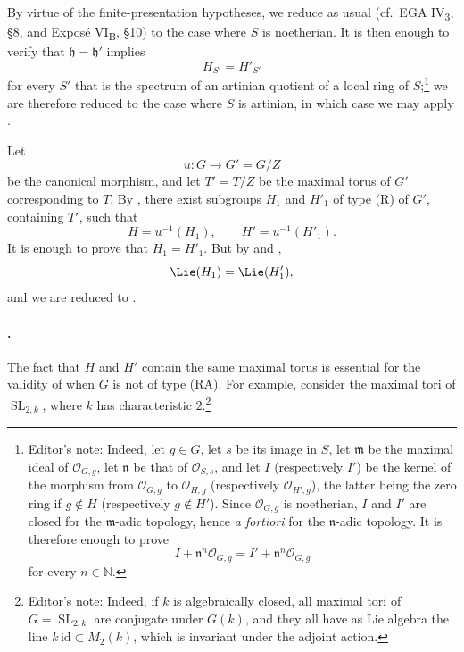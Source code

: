 By virtue of the finite-presentation hypotheses, we reduce as usual
\textup{(cf.\ EGA IV\textsubscript{3}, \S8, and Exposé
VI\textsubscript{B}, \S10)} to the case where \(S\) is noetherian.
It is then enough to verify that
\(\mathfrak h=\mathfrak h'\) implies
\[
  H_{S'}=H'_{S'}
\]
for every \(S'\) that is the spectrum of an artinian quotient of a
local ring of \(S\);\footnote{Editor's note: Indeed, let \(g\in G\),
let \(s\) be its image in \(S\), let \(\mathfrak m\) be the maximal
ideal of \(\mathcal O_{G,g}\), let \(\mathfrak n\) be that of
\(\mathcal O_{S,s}\), and let \(I\) (respectively \(I'\)) be the
kernel of the morphism from \(\mathcal O_{G,g}\) to
\(\mathcal O_{H,g}\) (respectively \(\mathcal O_{H',g}\)), the
latter being the zero ring if \(g\notin H\) (respectively
\(g\notin H'\)). Since \(\mathcal O_{G,g}\) is noetherian, \(I\)
and \(I'\) are closed for the \(\mathfrak m\)-adic topology, hence
\emph{a fortiori} for the \(\mathfrak n\)-adic topology. It is
therefore enough to prove
\[
  I+\mathfrak n^n\mathcal O_{G,g}
  =
  I'+\mathfrak n^n\mathcal O_{G,g}
\]
for every \(n\in\mathbb N\).} we are therefore reduced to the case
where \(S\) is artinian, in which case we may apply .

Let
\[
  u:G\longrightarrow G'=G/Z
\]
be the canonical morphism, and let \(T'=T/Z\) be the maximal torus
of \(G'\) corresponding to \(T\). By , there exist
subgroups \(H_1\) and \(H'_1\) of type \textup{(R)} of \(G'\),
containing \(T'\), such that
\[
  H=u^{-1}(H_1),
  \qquad
  H'=u^{-1}(H'_1).
\]
It is enough to prove that \(H_1=H'_1\). But by  and ,
\[
  \Lie(H_1)=\Lie(H'_1),
\]
and we are reduced to .

\paragraph{.}
The fact that \(H\) and \(H'\) contain the same maximal torus is
essential for the validity of  when \(G\) is not of type
\textup{(RA)}. For example, consider the maximal tori of
\(\operatorname{SL}_{2,k}\), where \(k\) has characteristic
\(2\).\footnote{Editor's note: Indeed, if \(k\) is algebraically
closed, all maximal tori of \(G=\operatorname{SL}_{2,k}\) are
conjugate under \(G(k)\), and they all have as Lie algebra the line
\(k\,\mathrm{id}\subset M_2(k)\), which is invariant under the
adjoint action.}

